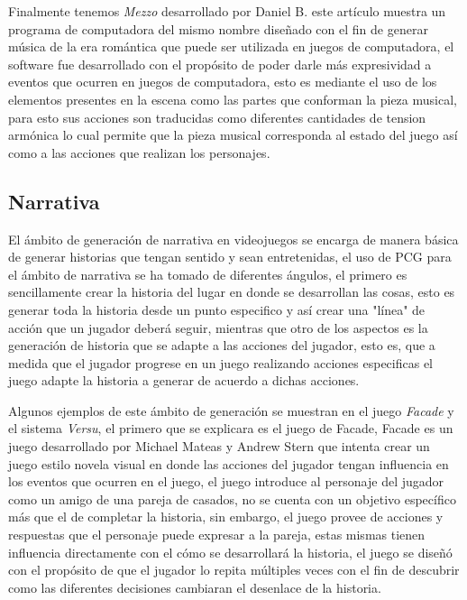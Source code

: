Finalmente tenemos \textit{Mezzo} desarrollado por Daniel B. \cite{brown2012mezzo} este artículo muestra
un programa de computadora del mismo nombre diseñado con el fin de generar
música de la era romántica que puede ser utilizada en juegos de computadora, el
software fue desarrollado con el propósito de poder darle más expresividad a
eventos que ocurren en juegos de computadora, esto es mediante el uso de los
elementos presentes en la escena como las partes que conforman la pieza musical,
para esto sus acciones son traducidas como diferentes cantidades de tension
armónica lo cual permite que la pieza musical corresponda al estado del juego
así como a las acciones que realizan los personajes.

\subsection{Narrativa}
\label{subsection:Narrative}

El ámbito de generación de narrativa en videojuegos se encarga de manera básica
de generar historias que tengan sentido y sean entretenidas, el uso de PCG para
el ámbito de narrativa se ha tomado de diferentes ángulos, el primero es
sencillamente crear la historia del lugar en donde se desarrollan las cosas,
esto es generar toda la historia desde un punto especifico y así crear una
"línea" de acción que un jugador deberá seguir, mientras que otro de los
aspectos es la generación de historia que se adapte a las acciones del jugador,
esto es, que a medida que el jugador progrese en un juego realizando acciones
especificas el juego adapte la historia a generar de acuerdo a dichas acciones.

Algunos ejemplos de este ámbito de generación se muestran en el juego
\textit{Facade} y el sistema \textit{Versu}, el primero que se explicara es el
juego de Facade, Facade es un juego desarrollado por Michael Mateas y Andrew
Stern \cite{mateas2003faccade} que intenta crear un juego estilo novela visual
en donde las acciones del jugador tengan influencia en los eventos que ocurren
en el juego, el juego introduce al personaje del jugador como un amigo de una
pareja de casados, no se cuenta con un objetivo específico más que el de
completar la historia, sin embargo, el juego provee de acciones y respuestas que
el personaje puede expresar a la pareja, estas mismas tienen influencia
directamente con el cómo se desarrollará la historia, el juego se diseñó con el
propósito de que el jugador lo repita múltiples veces con el fin de descubrir
como las diferentes decisiones cambiaran el desenlace de la historia. 


